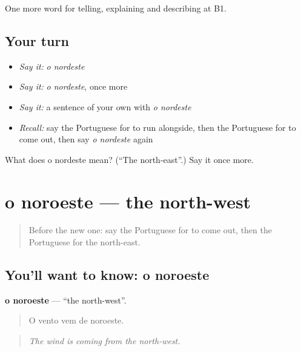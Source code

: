 \begin{grammarlens}[title={What you've built}]
One more word for telling, explaining and describing at B1.
\end{grammarlens}

\subsection*{Your turn}
\begin{itemize}
\raggedright
  \item \emph{Say it:} \emph{o nordeste}
  \item \emph{Say it:} \emph{o nordeste}, once more
  \item \emph{Say it:} a sentence of your own with \emph{o nordeste}
  \item \emph{Recall:} say the Portuguese for to run alongside, then the Portuguese for to come out, then say \emph{o nordeste} again
\end{itemize}

\begin{tcolorbox}[breakable,colback=teal!4,colframe=teal!35!black,title={Before you move on}]
What does o nordeste mean? (\textquotedblleft{}The north-east\textquotedblright{}.) Say it once more.
\end{tcolorbox}
\section[o noroeste]{o noroeste — the north-west}

\label{lesson:PT-C439-noroeste}



\begin{quote}
Before the new one: say the Portuguese for to come out, then the Portuguese for the north-east.
\end{quote}

\subsection*{You'll want to know: o noroeste}
\textbf{o noroeste} — \textquotedblleft{}the north-west\textquotedblright{}.

\begin{quote}
O vento vem de noroeste.
\end{quote}

\begin{quote}
\emph{The wind is coming from the north-west.}
\end{quote}

